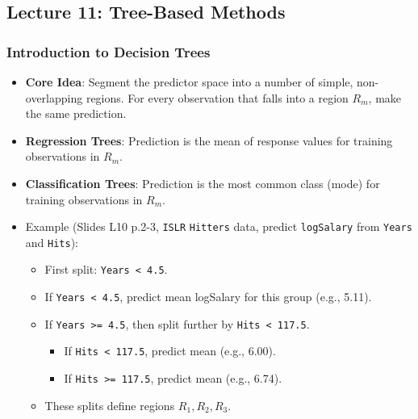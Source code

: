 \documentclass[12pt,a4paper]{article}
\newcommand{\Rpackage}[1]{\texttt{#1}} %
\newcommand{\Robject}[1]{\texttt{#1}} %
\newcommand{\Rcode}[1]{\texttt{#1}} %
\begin{document}
\begin{itemize}
\subsection{Lecture 11: Tree-Based Methods }
    \subsubsection{Introduction to Decision Trees }
        \begin{itemize}
            \item \textbf{Core Idea}: Segment the predictor space into a number of simple, non-overlapping regions. For every observation that falls into a region $R_m$, make the same prediction.
            \item \textbf{Regression Trees}: Prediction is the mean of response values for training observations in $R_m$.
            \item \textbf{Classification Trees}: Prediction is the most common class (mode) for training observations in $R_m$.
            \item Example (Slides L10 p.2-3, \Rpackage{ISLR} \Robject{Hitters} data, predict \Robject{logSalary} from \Robject{Years} and \Robject{Hits}):
                \begin{itemize}
                    \item First split: \Rcode{Years < 4.5}.
                    \item If \Rcode{Years < 4.5}, predict mean logSalary for this group (e.g., 5.11).
                    \item If \Rcode{Years >= 4.5}, then split further by \Rcode{Hits < 117.5}.
                        \begin{itemize}
                            \item If \Rcode{Hits < 117.5}, predict mean (e.g., 6.00).
                            \item If \Rcode{Hits >= 117.5}, predict mean (e.g., 6.74).
                        \end{itemize}
                    \item These splits define regions $R_1, R_2, R_3$.
                \end{itemize}
        \end{itemize}

\end{itemize}
\end{document}
